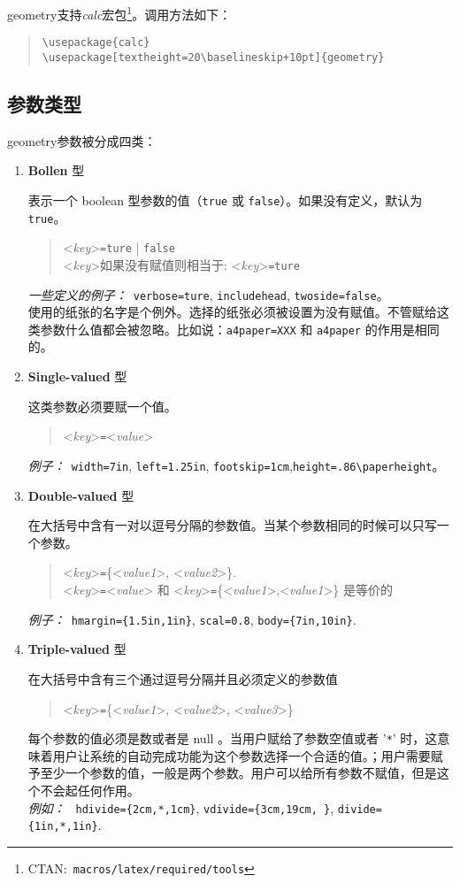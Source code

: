 \documentclass[titlepage]{ctexart}
\def\Gm{\textsf{geometry}}
\begin{document}
	 \Gm 支持\textsl{calc}宏包\footnote{CTAN:~\texttt{macros/latex/required/tools}}。调用方法如下：
	 \begin{quote}
	 	\verb|\usepackage{calc}|\\
	 	\verb|\usepackage[textheight=20\baselineskip+10pt]{geometry}|
	 \end{quote}
	 
	 \subsection{参数类型}
	 \Gm 参数被分成四类：
	 \begin{enumerate}\itemsep=0pt
	 \item \textbf{Bollen} 型
	 
	 表示一个 boolean 型参数的值（\verb|true| 或 \verb|false|）。如果没有定义，默认为 \verb|true|。
	 \begin{quote}
	 <\emph{key}>\verb|=ture| | \verb|false|\\
	 <\emph{key}>如果没有赋值则相当于: <\emph{key}>\verb|=ture|
	 \end{quote}
	 \textit{一些定义的例子：}~\verb|verbose=ture|, \verb|includehead|, \verb|twoside=false|。\\
	 使用的纸张的名字是个例外。选择的纸张必须被设置为没有赋值。不管赋给这类参数什么值都会被忽略。比如说：\verb|a4paper=XXX| 和 \verb|a4paper| 的作用是相同的。
	 
	 \item \textbf{Single-valued} 型
	 
	 这类参数必须要赋一个值。
	 \begin{quote}
	 <\emph{key}>\verb|=|<\emph{value}>
	 \end{quote}
	 \textit{例子：}~\verb|width=7in|, \verb|left=1.25in|, \verb|footskip=1cm|,\verb|height=.86\paperheight|。
	 
	 \item \textbf{Double-valued} 型
	 
	 在大括号中含有一对以逗号分隔的参数值。当某个参数相同的时候可以只写一个参数。
	 \begin{quote}
	 <\emph{key}>\verb|=|\{<\emph{value1}>, <\emph{value2}>\}.\\
	 <\emph{key}>\verb|=|<\emph{value}> 和 <\emph{key}>\verb|=|\{<\emph{value1}>,<\emph{value1}>\} 是等价的
	 \end{quote}
	 \textit{例子：}~\verb|hmargin={1.5in,1in}|, \verb|scal=0.8|, \verb|body={7in,10in}|.
	 
	 \item \textbf{Triple-valued} 型
	 
	 在大括号中含有三个通过逗号分隔并且必须定义的参数值
	 \begin{quote}
	<\emph{key}>\verb|=|\{<\emph{value1}>, <\emph{value2}>, <\emph{value3}>\}
	 \end{quote}
	 每个参数的值必须是数或者是 null 。当用户赋给了参数空值或者 '\verb|*|' 时，这意味着用户让系统的自动完成功能为这个参数选择一个合适的值。；用户需要赋予至少一个参数的值，一般是两个参数。用户可以给所有参数不赋值，但是这个不会起任何作用。\\
	 \textit{例如：}~ \verb|hdivide={2cm,*,1cm}|, \verb|vdivide={3cm,19cm, }|, \verb|divide={1in,*,1in}|.
	 \end{enumerate}
	 
\end{document}

